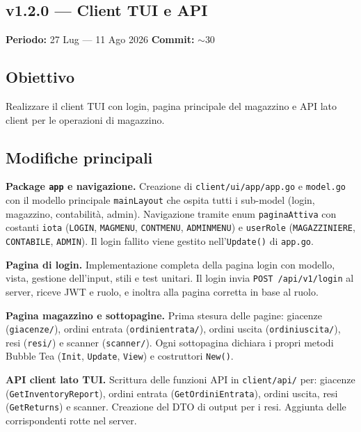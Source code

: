 \documentclass[a4paper,12pt]{article}
\begin{document}
\newpage

\begin{decisionbox}
\section*{v1.2.0 --- Client TUI e API}
\textbf{Periodo:} 27 Lug --- 11 Ago 2026 \hfill \textbf{Commit:} $\sim$30
\end{decisionbox}

\subsection*{Obiettivo}
Realizzare il client TUI con login, pagina principale del magazzino e API lato client per le operazioni di magazzino.

\subsection*{Modifiche principali}

\textbf{Package \texttt{app} e navigazione.}
Creazione di \texttt{client/ui/app/app.go} e \texttt{model.go} con il modello principale \texttt{mainLayout} che ospita tutti i sub-model (login, magazzino, contabilit\`{a}, admin). Navigazione tramite enum \texttt{paginaAttiva} con costanti \texttt{iota} (\texttt{LOGIN}, \texttt{MAGMENU}, \texttt{CONTMENU}, \texttt{ADMINMENU}) e \texttt{userRole} (\texttt{MAGAZZINIERE}, \texttt{CONTABILE}, \texttt{ADMIN}). Il login fallito viene gestito nell'\texttt{Update()} di \texttt{app.go}.

\textbf{Pagina di login.}
Implementazione completa della pagina login con modello, vista, gestione dell'input, stili e test unitari. Il login invia \texttt{POST /api/v1/login} al server, riceve JWT e ruolo, e inoltra alla pagina corretta in base al ruolo.

\textbf{Pagina magazzino e sottopagine.}
Prima stesura delle pagine: giacenze (\texttt{giacenze/}), ordini entrata (\texttt{ordinientrata/}), ordini uscita (\texttt{ordiniuscita/}), resi (\texttt{resi/}) e scanner (\texttt{scanner/}). Ogni sottopagina dichiara i propri metodi Bubble Tea (\texttt{Init}, \texttt{Update}, \texttt{View}) e costruttori \texttt{New()}.

\textbf{API client lato TUI.}
Scrittura delle funzioni API in \texttt{client/api/} per: giacenze (\texttt{GetInventoryReport}), ordini entrata (\texttt{GetOrdiniEntrata}), ordini uscita, resi (\texttt{GetReturns}) e scanner. Creazione del DTO di output per i resi. Aggiunta delle corrispondenti rotte nel server.
\end{document}
